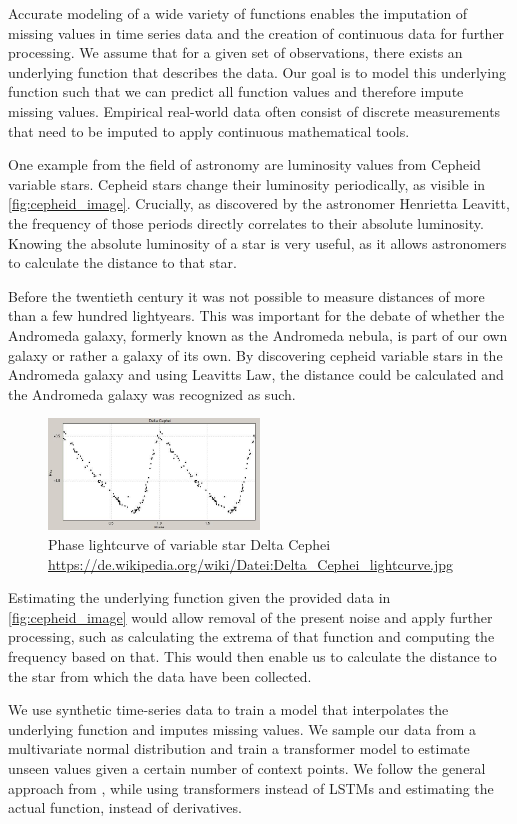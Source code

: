 Accurate modeling of a wide variety of functions enables the imputation of missing values in time series data and the creation of continuous data for further processing. We assume that for a given set of observations, there exists an underlying function that describes the data. Our goal is to model this underlying function such that we can predict all function values and therefore impute missing values. Empirical real-world data often consist of discrete measurements that need to be imputed to apply continuous mathematical tools.

One example from the field of astronomy are luminosity values from Cepheid variable stars. Cepheid stars change their luminosity periodically, as visible in \autoref{fig:cepheid_image}. Crucially, as discovered by the astronomer Henrietta Leavitt, the frequency of those periods directly correlates to their absolute luminosity. Knowing the absolute luminosity of a star is very useful, as it allows astronomers to calculate the distance to that star.

Before the twentieth century it was not possible to measure distances of more than a few hundred lightyears. This was important for the debate of whether the Andromeda galaxy, formerly known as the Andromeda nebula, is part of our own galaxy or rather a galaxy of its own. By discovering cepheid variable stars in the Andromeda galaxy and using Leavitts Law, the distance could be calculated and the Andromeda galaxy was recognized as such. \cite{gaßnerAstroBook}

\begin{figure}[h]
	\centering
	\includegraphics[width = 0.5\textwidth]{figures/Cephei}
	\caption{Phase lightcurve of variable star Delta Cephei \tiny\url{ https://de.wikipedia.org/wiki/Datei:Delta_Cephei_lightcurve.jpg}}
	\label{fig:cepheid_image}
\end{figure}

Estimating the underlying function given the provided data in \autoref{fig:cepheid_image} would allow removal of the present noise and apply further processing, such as calculating the extrema of that function and computing the frequency based on that. This would then enable us to calculate the distance to the star from which the data have been collected.

We use synthetic time-series data to train a model that interpolates the underlying function and imputes missing values. We sample our data from a multivariate normal distribution and train a transformer model to estimate unseen values given a certain number of context points. We follow the general approach from \citet{seifner2025zeroshotimputationfoundationinference}, while using transformers instead of LSTMs and estimating the actual function, instead of derivatives.